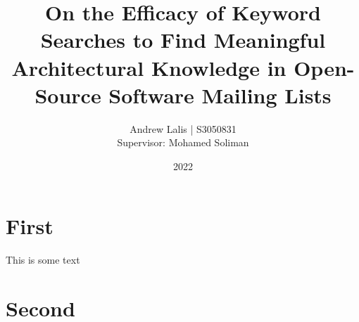 \documentclass[a4paper, 12pt]{article}
\title{On the Efficacy of Keyword Searches to Find Meaningful Architectural Knowledge in Open-Source Software Mailing Lists}
\date{2022}
\author{Andrew Lalis | S3050831\\Supervisor: Mohamed Soliman}
\begin{document}
\maketitle

\section{First}
	This is some text

\section{Second}
\end{document}
